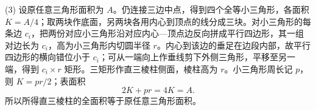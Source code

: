 \begin{answer}

(3) 设原任意三角形面积为 $A$。仍连接三边中点，得到四个全等小三角形，各面积 $K=A/4$；取两块作底面，另两块各用内心到顶点的线分成三块。对小三角形的每条边 $c_i$，把两份对应小三角形沿对应内心—顶点边反向拼成平行四边形，其一组对边长为 $c_i$，高为小三角形内切圆半径 $r$。内心到该边的垂足在边段内部，故平行四边形的横向错位小于 $c_i$；可从一端向上作垂线剪下外侧三角形，平移至另一端，得到 $c_i\times r$ 矩形。三矩形作直三棱柱侧面，棱柱高为 $r$。小三角形周长记 $p$，则 $K=pr/2$；表面积
\nopagebreak[4]
\[
2K+pr=4K=A.
\]
所以所得直三棱柱的全面积等于原任意三角形面积。




\end{answer}

